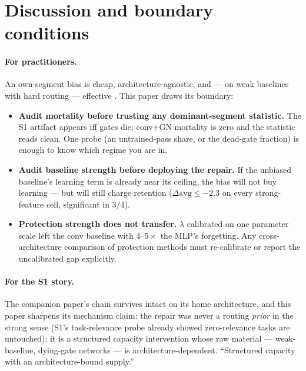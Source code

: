 \documentclass[review]{elsarticle}
\begin{document}
\section{Discussion and boundary conditions}
\label{sec:discussion}

\paragraph{For practitioners.} An own-segment bias is cheap,
architecture-agnostic, and --- on weak baselines with hard routing ---
effective \cite{zhou2026delpS1}. This paper draws its boundary:
\begin{itemize}
\item \textbf{Audit mortality before trusting any dominant-segment
statistic.} The S1 artifact appears iff gates die; conv+GN mortality
is zero and the statistic reads clean. One probe (an untrained-pass
share, or the dead-gate fraction) is enough to know which regime you
are in.
\item \textbf{Audit baseline strength before deploying the repair.}
If the unbiased baseline's learning term is already near its ceiling,
the bias will not buy learning --- but will still charge retention
($\Delta\mathrm{avg} \le -2.3$ on every strong-feature cell,
significant in $3/4$).
\item \textbf{Protection strength does not transfer.} $\lambda$
calibrated on one parameter scale left the conv baseline with
$4$--$5\times$ the MLP's forgetting. Any cross-architecture
comparison of protection methods must re-calibrate or report the
uncalibrated gap explicitly.
\end{itemize}

\paragraph{For the S1 story.} The companion paper's chain survives
intact on its home architecture, and this paper sharpens its
mechanism claim: the repair was never a routing \emph{prior} in the
strong sense (S1's task-relevance probe already showed
zero-relevance tasks are untouched); it is a structured capacity
intervention whose raw material --- weak-baseline, dying-gate
networks --- is architecture-dependent. ``Structured capacity with an
architecture-bound supply.''
\end{document}
